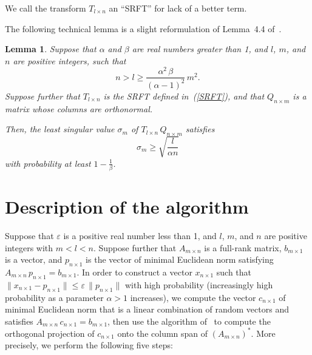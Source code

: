 \documentclass[letterpaper,12pt]{article}
\def\epsilon{\varepsilon}
\newtheorem{lemma}[theorem]{Lemma}
\begin{document}
We call the transform $T_{l \times n}$ an ``SRFT'' for lack of a better term.

The following technical lemma is a slight reformulation
of Lemma~4.4 of~\cite{woolfe-liberty-rokhlin-tygert}.

\begin{lemma}
\label{reformulation}
Suppose that $\alpha$ and $\beta$ are real numbers greater than 1,
and $l$, $m$, and $n$ are positive integers, such that
\begin{equation}
\label{weak}
n > l \ge \frac{\alpha^2 \, \beta}{(\alpha-1)^2} \, m^2.
\end{equation}
Suppose further that $T_{l \times n}$ is the SRFT defined in~(\ref{SRFT}),
and that $Q_{n \times m}$ is a matrix whose columns are orthonormal.

Then, the least singular value $\sigma_m$ of $T_{l \times n} \, Q_{n \times m}$
satisfies
\begin{equation}
\label{inverse}
\sigma_m \ge \sqrt{\frac{l}{\alpha n}}
\end{equation}
with probability at least $1-\frac{1}{\beta}$.
\end{lemma}



\section{Description of the algorithm}
\label{algorithm}


Suppose that $\epsilon$ is a positive real number less than 1,
and $l$, $m$, and $n$ are positive integers with $m < l < n$.
Suppose further that $A_{m \times n}$ is a full-rank matrix,
$b_{m \times 1}$ is a vector, and $p_{n \times 1}$ is the vector
of minimal Euclidean norm satisfying
$A_{m \times n} \, p_{n \times 1} = b_{m \times 1}$.
In order to construct a vector $x_{n \times 1}$ such that
$\| x_{n \times 1} - p_{n \times 1} \| \le \epsilon \, \| p_{n \times 1} \|$
with high probability (increasingly high probability as a parameter $\alpha>1$
increases), we compute the vector $c_{n \times 1}$ of minimal Euclidean norm
that is a linear combination of random vectors
and satisfies $A_{m \times n} \, c_{n \times 1} = b_{m \times 1}$,
then use the algorithm of~\cite{rokhlin-tygert}
to compute the orthogonal projection of $c_{n \times 1}$
onto the column span of $(A_{m \times n})^*$.
More precisely, we perform the following five steps:
\end{document}
